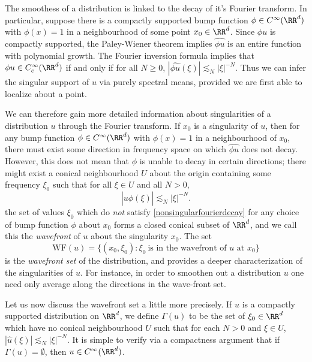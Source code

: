 The smoothess of a distribution is linked to the decay of it's Fourier transform. In particular, suppose there is a compactly supported bump function $\phi \in C^\infty(\RR^d)$ with $\phi(x) = 1$ in a neighbourhood of some point $x_0 \in \RR^d$. Since $\phi u$ is compactly supported, the Paley-Wiener theorem implies $\widehat{\phi u}$ is an entire function with polynomial growth. The Fourier inversion formula implies that $\phi u \in C_c^\infty(\RR^d)$ if and only if for all $N \geq 0$, $|\widehat{\phi u}(\xi)| \lesssim_N |\xi|^{-N}$. Thus we can infer the singular support of $u$ via purely spectral means, provided we are first able to localize about a point.

We can therefore gain more detailed information about singularities of a distribution $u$ through the Fourier transform. If $x_0$ is a singularity of $u$, then for any bump function $\phi \in C^\infty(\RR^d)$ with $\phi(x) = 1$ in a neighbourhood of $x_0$, there must exist some direction in frequency space on which $\widehat{\phi u}$ does not decay. However, this does not mean that $\phi$ is unable to decay in certain directions; there might exist a conical neighbourhood $U$ about the origin containing some frequency $\xi_0$ such that for all $\xi \in U$ and all $N > 0$,
%
\begin{equation} \label{nonsingularfourierdecay}
  |\widehat{u \phi}(\xi)| \lesssim_N |\xi|^{-N}.
\end{equation}
%
the set of values $\xi_0$ which do \emph{not} satisfy \eqref{nonsingularfourierdecay} for any choice of bump function $\phi$ about $x_0$ forms a closed conical subset of $\RR^d$, and we call this the \emph{wavefront} of $u$ about the singularity $x_0$. The set
%
\[ \text{WF}(u) = \{ (x_0,\xi_0) : \xi_0\ \text{is in the wavefront of $u$ at $x_0$} \} \]
%
is the \emph{wavefront set} of the distribution, and provides a deeper characterization of the singularities of $u$. For instance, in order to smoothen out a distribution $u$ one need only average along the directions in the wave-front set.

Let us now discuss the wavefront set a little more precisely. If $u$ is a compactly supported distribution on $\RR^d$, we define $\Gamma(u)$ to be the set of $\xi_0 \in \RR^d$ which have no conical neighbourhood $U$ such that for each $N > 0$ and $\xi \in U$, $|\widehat{u}(\xi)| \lesssim_N |\xi|^{-N}$. It is simple to verify via a compactness argument that if $\Gamma(u) = \emptyset$, then $u \in C^\infty(\RR^d)$.

